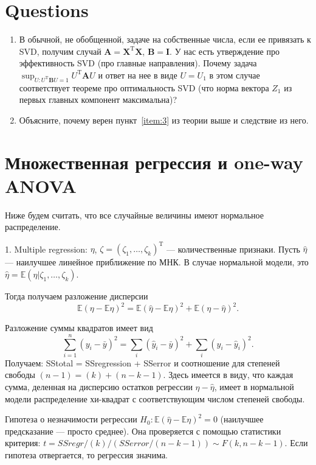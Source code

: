 \documentclass[12 pt]{article}
\def\E{\mathbb{E}}
\begin{document}
\section*{Questions}
\begin{enumerate}
\item
В обычной, не обобщенной, задаче на собственные числа, если ее привязать к SVD, получим случай $\mathbf{A}=\mathbf{X}^\mathrm{T} \mathbf{X}$, $\mathbf{B} = \mathbf{I}$.
У нас есть утверждение про эффективность SVD (про главные направления). Почему задача $\sup_{U: U^\mathrm{T}\mathbf{B}U = 1} U^\mathrm{T}\mathbf{A}U$
и ответ на нее в виде $U=U_1$ в этом случае соответствует теореме про оптимальность SVD (что норма вектора $Z_1$ из первых главных компонент максимальна)?
\item
Объясните, почему верен пункт~\ref{item:3} из теории выше и следствие из него.
\end{enumerate}
\newpage
\section{Множественная регрессия и one-way ANOVA}

Ниже будем считать, что все случайные величины имеют нормальное распределение.

1. Multiple regression:  $\eta$, $\zeta=(\zeta_1,\ldots,\zeta_k)^\mathrm{T}$ --- количественные признаки.
Пусть $\hat{\eta}$ --- наилучшее линейное приближение по МНК. В случае нормальной модели, это
$\hat{\eta}=\E(\eta|\zeta_1,\ldots,\zeta_k)$.

Тогда получаем разложение дисперсии
\begin{equation}
\label{eq:pif_eta}
\E(\eta - \E\eta)^2 = \E(\hat\eta - \E\eta)^2 + \E(\eta - \hat\eta)^2.
\end{equation}

Разложение суммы квадратов имеет вид
\begin{equation}\label{eq:pif_y}
\sum_{i=1}^n(y_i-\bar{y})^2 = \sum_i(\hat{y}_i-\bar{y})^2 + \sum_i(y_i-\hat{y}_i)^2.
\end{equation}
Получаем: \mbox{SStotal}  = \mbox{SSregression} + \mbox{SSerror}
и соотношение для степеней свободы $(n-1) = (k) + (n-k-1)$. Здесь имеется в виду, что каждая сумма,
деленная на дисперсию остатков регрессии $\eta - \hat\eta$, имеет в нормальной модели распределение
хи-квадрат с соответствующим числом степеней свободы. 

Гипотеза о незначимости регрессии $H_0: \E(\hat\eta - \E\eta)^2 = 0$ (наилучшее предсказание --- просто среднее). Она проверяется с помощью статистики критерия: $t = SSregr/(k) / (SSerror/(n-k-1))\sim F(k, n-k-1)$. Если гипотеза отвергается, то регрессия значима.\\
\end{document}

